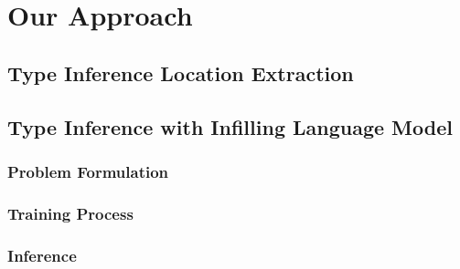 \section{Our Approach}
\label{sec:approach}

\subsection{Type Inference Location Extraction}

\subsection{Type Inference with Infilling Language Model}
\subsubsection{Problem Formulation}

\subsubsection{Training Process}

\subsubsection{Inference}